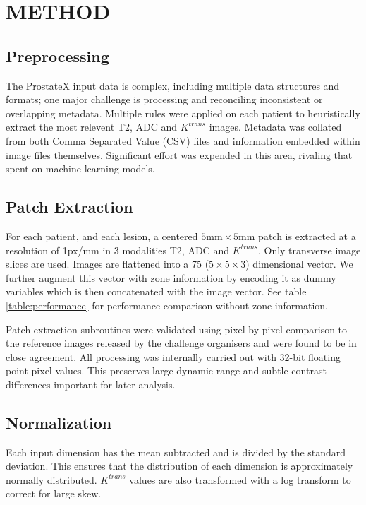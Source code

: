 \documentclass[a4paper]{spie}
\begin{document}
\section{METHOD}

\subsection{Preprocessing}

The ProstateX input data is complex, including multiple data structures and formats; one major challenge is processing and reconciling inconsistent or overlapping metadata. Multiple rules were applied on each patient to heuristically extract the most relevent T2, ADC and $K^{\mathit{trans}}$ images. Metadata was collated from both Comma Separated Value (CSV) files and information embedded within image files themselves. Significant effort was expended in this area, rivaling that spent on machine learning models.

\subsection{Patch Extraction}

For each patient, and each lesion, a centered $5\text{mm} \times 5\text{mm}$ patch is extracted at a resolution of 1px/mm in 3 modalities T2, ADC and $K^{\mathit{trans}}$. Only transverse image slices are used. Images are flattened into a 75 ($5 \times 5 \times 3$) dimensional vector. We further augment this vector with zone information by encoding it as dummy variables\cite{Hastie2009} which is then concatenated with the image vector. See table \ref{table:performance} for performance comparison without zone information.

Patch extraction subroutines were validated using pixel-by-pixel comparison to the reference images released by the challenge organisers and were found to be in close agreement. All processing was internally carried out with 32-bit floating point pixel values. This preserves large dynamic range and subtle contrast differences important for later analysis.

\subsection{Normalization}

Each input dimension has the mean subtracted and is divided by the standard deviation. This ensures that the distribution of each dimension is approximately normally distributed. $K^{\mathit{trans}}$ values are also transformed with a log transform to correct for large skew.
\end{document}
